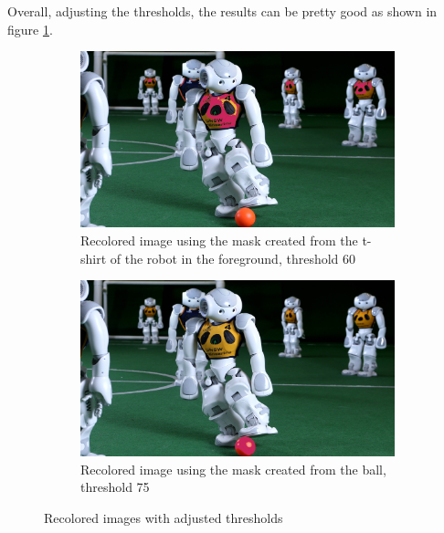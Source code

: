 \documentclass{article}
\begin{document}
Overall, adjusting the thresholds, the results can be pretty good as shown in figure \ref{fig:recolorBGRbetter}.
\begin{figure}[H]
	\centering
	\begin{subfigure}{0.4\textwidth}
		\includegraphics[width=\textwidth]{robocup_recolorBGR60shirt.jpg}
		\caption{Recolored image using the mask created from the t-shirt of the robot in the foreground, threshold 60}
	\end{subfigure}
	\hfill
	\begin{subfigure}{0.4\textwidth}
		\includegraphics[width=\textwidth]{robocup_recolorBGR75ball.jpg}
		\caption{Recolored image using the mask created from the ball, threshold 75}
	\end{subfigure}
	\caption{Recolored images with adjusted thresholds}
	\label{fig:recolorBGRbetter}
\end{figure}
\end{document}
